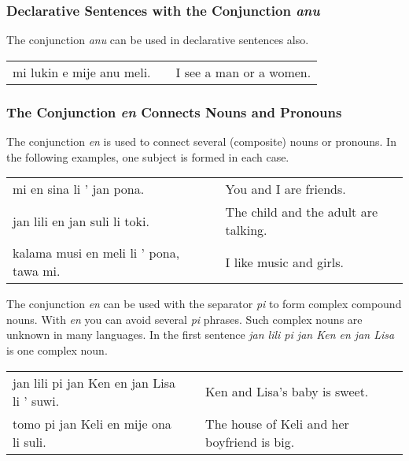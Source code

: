 %
\subsubsection*{Declarative Sentences with the Conjunction \textit{anu}}
%

The conjunction \textit{anu} can be used in declarative sentences also.

\begin{supertabular}{p{5,5cm}|ll}
mi lukin e mije anu meli. && I see a man or a women. \\ 
\end{supertabular} 

%
\subsubsection*{The Conjunction \textit{en} Connects Nouns and Pronouns}
%
%
The conjunction \textit{en} is used to connect several (composite) nouns or pronouns. 
In the following examples, one subject is formed in each case.

\begin{supertabular}{p{5,5cm}|ll}
mi en sina li ' jan pona. && You and I are friends. \\
jan lili en jan suli li toki. && The child and the adult are talking. \\
kalama musi en meli li ' pona, tawa mi. && I like music and girls. \\
\end{supertabular} 

The conjunction \textit{en} can be used with the separator \textit{pi} to form complex compound nouns. 
With \textit{en} you can avoid several \textit{pi} phrases.
Such complex nouns are unknown in many languages. 
In the first sentence \textit{jan lili pi jan Ken en jan Lisa} is one complex noun. 

\begin{supertabular}{p{5,5cm}|ll}
jan lili pi jan Ken en jan Lisa li ' suwi. && Ken and Lisa's baby is sweet. \\
tomo pi jan Keli en mije ona li suli. && The house of Keli and her boyfriend is big. \\
\end{supertabular} 
%

